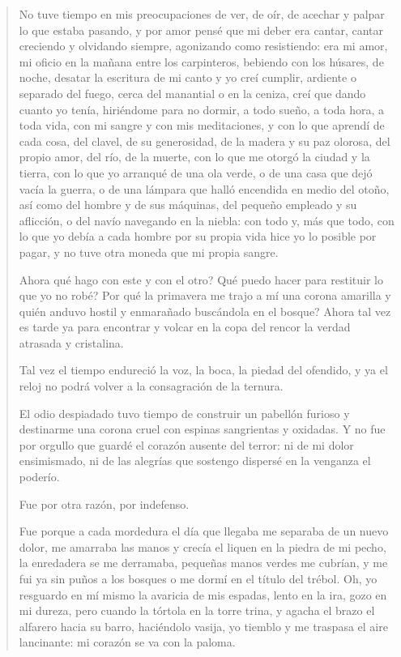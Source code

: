 \documentclass[12pt]{article}
\begin{document}
\begin{verse}
No tuve tiempo en mis preocupaciones  
de ver, de oír, de acechar y palpar  
lo que estaba pasando, y por amor  
pensé que mi deber era cantar,  
cantar creciendo y olvidando siempre,  
agonizando como resistiendo:  
era mi amor, mi oficio  
en la mañana entre los carpinteros,  
bebiendo con los húsares, de noche,  
desatar la escritura de mi canto  
y yo creí cumplir,  
ardiente o separado  
del fuego,  
cerca del manantial o en la ceniza,  
creí que dando cuanto yo tenía,  
hiriéndome para no dormir,  
a todo sueño, a toda hora, a toda vida,  
con mi sangre y con mis meditaciones,  
y con lo que aprendí de cada cosa,  
del clavel, de su generosidad,  
de la madera y su paz olorosa,  
del propio amor, del río, de la muerte,  
con lo que me otorgó la ciudad y la tierra,  
con lo que yo arranqué de una ola verde,  
o de una casa que dejó vacía  
la guerra, o de una lámpara  
que halló encendida en medio del otoño,  
así como del hombre y de sus máquinas,  
del pequeño empleado y su aflicción,  
o del navío navegando en la niebla:  
con todo y, más que todo, con lo que yo debía  
a cada hombre por su propia vida  
hice yo lo posible por pagar, y no tuve  
otra moneda que mi propia sangre.  

Ahora qué hago con este y con el otro?  
Qué puedo hacer para restituir  
lo que yo no robé? Por qué la primavera  
me trajo a mí una corona amarilla  
y quién anduvo hostil y enmarañado  
buscándola en el bosque? Ahora  
tal vez es tarde ya para encontrar  
y volcar en la copa del rencor  
la verdad atrasada y cristalina.  

Tal vez el tiempo endureció la voz,  
la boca, la piedad del ofendido,  
y ya el reloj no podrá volver  
a la consagración de la ternura.  

El odio despiadado tuvo tiempo  
de construir un pabellón furioso  
y destinarme una corona cruel  
con espinas sangrientas y oxidadas.  
Y no fue por orgullo que guardé  
el corazón ausente del terror:  
ni de mi dolor ensimismado,  
ni de las alegrías que sostengo  
dispersé  
en la venganza  
el poderío.  

Fue por otra razón, por indefenso.  

Fue porque a cada mordedura  
el día  
que llegaba  
me separaba de un nuevo dolor,  
me amarraba las manos y crecía  
el liquen en la piedra de mi pecho,  
la enredadera se me derramaba,  
pequeñas manos verdes me cubrían,  
y me fui ya sin puños a los bosques  
o me dormí en el título del trébol.  
Oh, yo resguardo en mí mismo la avaricia  
de mis espadas, lento  
en la ira,  
gozo  
en mi dureza,  
pero cuando la tórtola en la torre  
trina, y agacha el brazo el alfarero  
hacia su barro, haciéndolo vasija,  
yo tiemblo y me traspasa  
el aire lancinante:  
mi corazón se va con la paloma.  


\end{verse}
\end{document}
